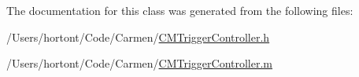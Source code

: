 The documentation for this class was generated from the following files:\begin{CompactItemize}
\item 
/Users/hortont/Code/Carmen/\hyperlink{_c_m_trigger_controller_8h}{CMTriggerController.h}\item 
/Users/hortont/Code/Carmen/\hyperlink{_c_m_trigger_controller_8m}{CMTriggerController.m}\end{CompactItemize}
